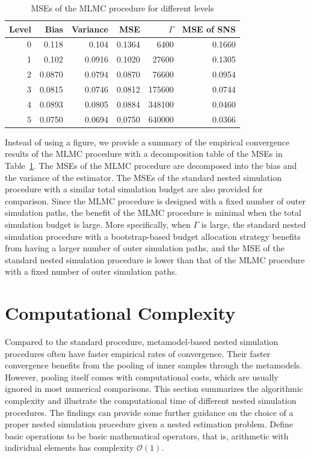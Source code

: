 \begin{table}[ht]
    \centering
    \begin{tabular}{rrrrrr}
    \toprule
    \textbf{Level} & \textbf{Bias} & \textbf{Variance} & \textbf{MSE} & $\Gamma$ & \textbf{MSE of SNS} \\ 
    \hline\hline
    0 & 0.118  & 0.104  & 0.1364 & 6400     & 0.1660    \\
    1 & 0.102  & 0.0916 & 0.1020 & 27600    & 0.1305    \\
    2 & 0.0870 & 0.0794 & 0.0870 & 76600    & 0.0954    \\
    3 & 0.0815 & 0.0746 & 0.0812 & 175600   & 0.0744    \\
    4 & 0.0893 & 0.0805 & 0.0884 & 348100   & 0.0460    \\
    5 & 0.0750 & 0.0694 & 0.0750 & 640000   & 0.0366    \\
    \bottomrule
    \end{tabular}
    \caption{MSEs of the MLMC procedure for different levels}
    \label{tab1:mlmc-mse}
\end{table}

Instead of using a figure, we provide a summary of the empirical convergence results of the MLMC procedure with a decomposition table of the MSEs in Table~\ref{tab1:mlmc-mse}.
The MSEs of the MLMC procedure are decomposed into the bias and the variance of the estimator.
The MSEs of the standard nested simulation procedure with a similar total simulation budget are also provided for comparison.
Since the MLMC procedure is designed with a fixed number of outer simulation paths, the benefit of the MLMC procedure is minimal when the total simulation budget is large.
More specifically, when $\Gamma$ is large, the standard nested simulation procedure with a bootstrap-based budget allocation strategy benefits from having a larger number of outer simulation paths, and the MSE of the standard nested simulation procedure is lower than that of the MLMC procedure with a fixed number of outer simulation paths.

\section{Computational Complexity} \label{sec1:computational-complexity}
Compared to the standard procedure, metamodel-based nested simulation procedures often have faster empirical rates of convergence.
Their faster convergence benefits from the pooling of inner samples through the metamodels. 
However, pooling itself comes with computational costs, which are usually ignored in most numerical comparisons. 
This section summarizes the algorithmic complexity and illustrate the computational time of different nested simulation procedures.
The findings can provide some further guidance on the choice of a proper nested simulation procedure given a nested estimation problem.
Define basic operations to be basic mathematical operators, that is, arithmetic with individual elements has complexity $\mathcal{O}(1)$.

